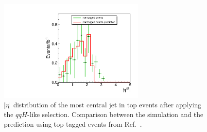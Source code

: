 \begin{figure}[!htbp]
\begin{center}
\includegraphics[width=0.65\textwidth]{figures/vbf_btagprediction_jetmin.pdf}
\caption{$|\eta|$ distribution of the most central jet in top events after 
applying the $qqH$-like selection. Comparison between the simulation and 
the prediction using top-tagged events from Ref.~\cite{HWWICHEP2012}.}
\label{fig:vbf_btagprediction_jetmin}
\end{center}
\end{figure}
